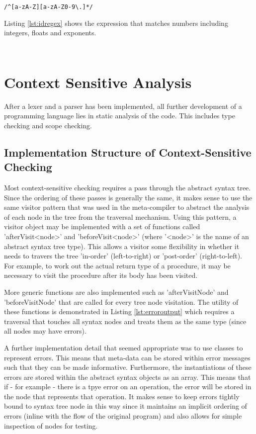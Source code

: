 \documentclass{article}
\begin{document}
\begin{lstlisting}[caption={},label={lst:idregex}, escapechar="|"]
/^[a-zA-Z][a-zA-Z0-9\.]*/
\end{lstlisting}

Listing \ref{lst:idregex} shows the expression that matches numbers including integers, floats and exponents.

\begin{lstlisting}[caption={},label={lst:numberregex}, escapechar="|"]
 
\end{lstlisting}

\section{Context Sensitive Analysis}

After a lexer and a parser has been implemented, all further development of a programming language lies in static analysis of the code. This includes type checking and scope checking.


\subsection{Implementation Structure of Context-Sensitive Checking}

Most context-sensitive checking requires a pass through the abstract syntax tree. Since the ordering of these passes is generally the same, it makes sense to use the same visitor pattern that was used in the meta-compiler to abstract the analysis of each node in the tree from the traversal mechanism. Using this pattern, a visitor object may be implemented with a set of functions called 'afterVisit<node>' and 'beforeVisit<node>' (where '<node>' is the name of an abstract syntax tree type). This allows a visitor some flexibility in whether it needs to travers the tree 'in-order' (left-to-right) or 'post-order' (right-to-left). For example, to work out the actual return type of a procedure, it may be necessary to visit the procedure after its body has been visited.

More generic functions are also implemented such as 'afterVisitNode' and 'beforeVisitNode' that are called for every tree node visitation. The utility of these functions is demonstrated in Listing \ref{lst:erroroutput} which requires a traversal that touches all syntax nodes and treats them as the same type (since all nodes may have errors).

A further implementation detail that seemed appropriate was to use classes to represent errors. This means that meta-data can be stored within error messages such that they can be made informative. Furthermore, the instantiations of these errors are stored within the abstract syntax objects as an array. This means that if - for example - there is a tpye error on an operation, the error will be stored in the node that represents that operation. It makes sense to keep errors tightly bound to syntax tree node in this way since it maintains an implicit ordering of errors (inline with the flow of the original program) and also allows for simple inspection of nodes for testing.
\end{document}
